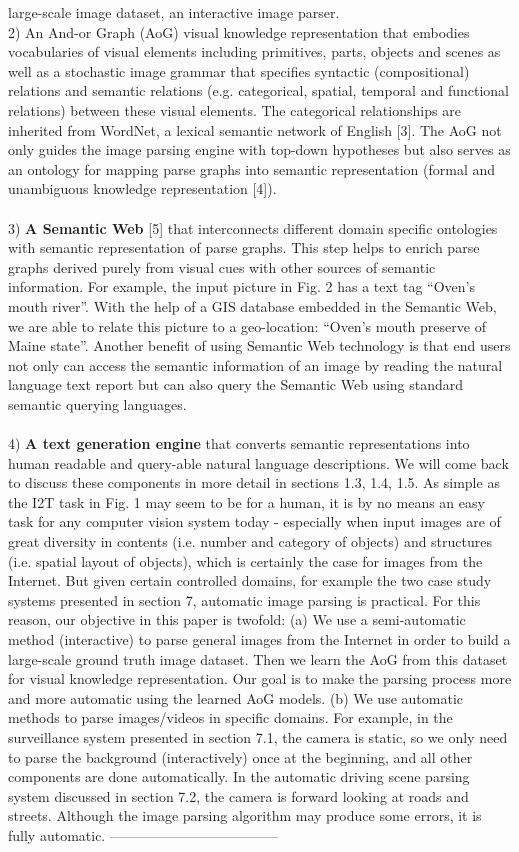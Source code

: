 \documentclass{article}
\begin{document}
large-scale image dataset, an interactive image parser.\\
2) An And-or Graph (AoG) visual knowledge representation
that embodies vocabularies of visual elements
including primitives, parts, objects and scenes as well
as a stochastic image grammar that specifies syntactic
(compositional) relations and semantic relations (e.g.
categorical, spatial, temporal and functional relations)
between these visual elements. The categorical relationships
are inherited from WordNet, a lexical semantic
network of English [3]. The AoG not only guides the
image parsing engine with top-down hypotheses but
also serves as an ontology for mapping parse graphs
into semantic representation (formal and unambiguous
knowledge representation [4]).\\\\
3) \textbf{A Semantic Web} [5] that interconnects different
domain specific ontologies with semantic representation
of parse graphs. This step helps to enrich parse graphs
derived purely from visual cues with other sources of
semantic information. For example, the input picture
in Fig. 2 has a text tag “Oven’s mouth river”. With
the help of a GIS database embedded in the Semantic
Web, we are able to relate this picture to a geo-location:
“Oven’s mouth preserve of Maine state”. Another benefit
of using Semantic Web technology is that end users not
only can access the semantic information of an image
by reading the natural language text report but can
also query the Semantic Web using standard semantic
querying languages.\\\\
4) \textbf{A text generation engine} that converts semantic
representations into human readable and query-able natural
language descriptions. We will come back to discuss
these components in more detail in sections 1.3, 1.4, 1.5.
As simple as the I2T task in Fig. 1 may seem to be for a
human, it is by no means an easy task for any computer
vision system today - especially when input images are
of great diversity in contents (i.e. number and category
of objects) and structures (i.e. spatial layout of objects),
which is certainly the case for images from the Internet.
But given certain controlled domains, for example the
two case study systems presented in section 7, automatic
image parsing is practical. For this reason, our objective
in this paper is twofold:
(a) We use a semi-automatic method (interactive) to
parse general images from the Internet in order to build
a large-scale ground truth image dataset. Then we learn
the AoG from this dataset for visual knowledge representation.
Our goal is to make the parsing process more
and more automatic using the learned AoG models.
(b) We use automatic methods to parse images/videos
in specific domains. For example, in the surveillance
system presented in section 7.1, the camera is static, so
we only need to parse the background (interactively)
once at the beginning, and all other components are done
automatically. In the automatic driving scene parsing
system discussed in section 7.2, the camera is forward
looking at roads and streets. Although the image parsing
algorithm may produce some errors, it is fully automatic.
------------------------------------
\end{document}
